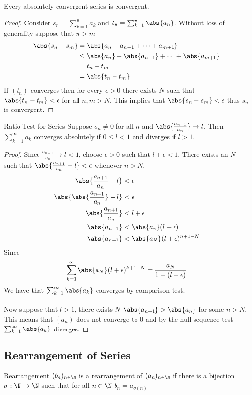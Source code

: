 \begin{thm}{}{} Every absolutely convergent series is convergent.\tcbline
\begin{proof} Consider $s_n=\sum_{k=1}^na_k$ and $t_n=\sum_{k=1}^n\abs{a_n}$. Without loss of generality suppose that $n>m$
\begin{align*}
\abs{s_n-s_m}&=\abs{a_n+a_{n-1}+\dots+a_{m+1}}\\
&\leq \abs{a_n}+\abs{a_{n-1}}+\dots+\abs{a_{m+1}}\\
&=t_n-t_m\\
&=\abs{t_n-t_m}
\end{align*}
If $(t_n)$ converges then for every $\epsilon>0$ there exists $N$ such that $\abs{t_n-t_m}<\epsilon$ for all $n,m>N$. This implies that $\abs{s_n-s_m}<\epsilon$ thus $s_n$ is convergent. 
\end{proof}
\end{thm}

\begin{thm}{Ratio Test for Series}{} Suppose $a_n\neq0$ for all $n$ and $\abs{\frac{a_{n+1}}{a_n}}\to l$. Then $\sum_{k=1}^{\infty}a_k$ converges absolutely if $0\leq l<1$ and diverges if $l>1$. \tcbline
\begin{proof}
Since $\frac{a_{n+1}}{a_n}\to l<1$, choose $\epsilon>0$ such that $l+\epsilon<1$. There exists an $N$ such that $\abs{\frac{a_{n+1}}{a_n}-l}<\epsilon$ whenever $n>N$. 
\begin{align*}
\abs{\frac{a_{n+1}}{a_n}-l}&<\epsilon\\
\abs{\abs{\frac{a_{n+1}}{a_n}}-l}&<\epsilon\\
\abs{\frac{a_{n+1}}{a_n}}&<l+\epsilon\\
\abs{a_{n+1}}&<\abs{a_n}(l+\epsilon)\\
\abs{a_{n+1}}&<\abs{a_N}(l+\epsilon)^{n+1-N}\\
\end{align*}
Since $$\sum_{k=1}^{\infty}\abs{a_N}(l+\epsilon)^{k+1-N}=\frac{a_N}{1-(l+\epsilon)}$$ We have that $\sum_{k=1}^{\infty}\abs{a_k}$ converges by comparison test. \\~\\
Now suppose that $l>1$, there exists $N$ $\abs{a_{n+1}}>\abs{a_n}$ for some $n>N$. This means that $(a_n)$ does not converge to $0$ and by the null sequence test $\sum_{k=1}^{\infty}\abs{a_k}$ diverges. 
\end{proof}
\end{thm}

\subsection{Rearrangement of Series}
\begin{defn}{Rearrangement}{} $(b_n)_{n\in\N}$ is a rearrangement of $(a_n)_{n\in\N}$ if there is a bijection $\sigma:\N\to\N$ such that for all $n\in\N$ $b_n=a_{\sigma(n)}$
\end{defn}

